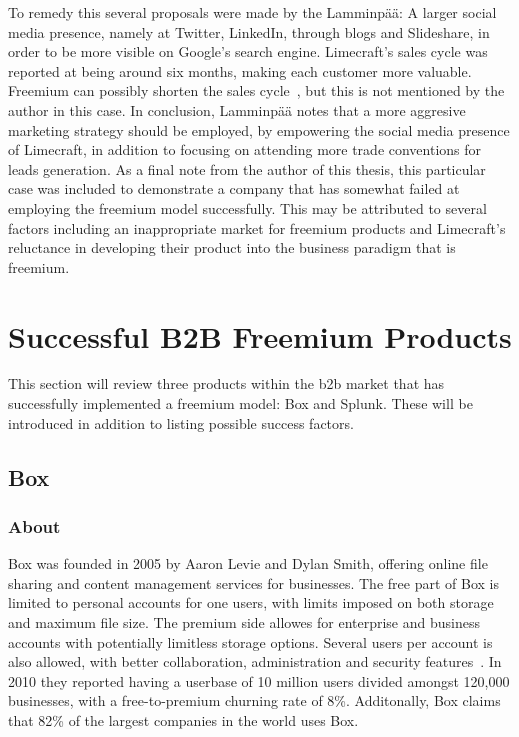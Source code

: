 {To remedy this several proposals were made by the Lamminpää: A larger social media presence, namely at Twitter, LinkedIn, through blogs and Slideshare, in order to be more visible on Google's search engine. Limecraft's sales cycle was reported at being around six months, making each customer more valuable. Freemium can possibly shorten the sales cycle~\cite{davidskokN/A}, but this is not mentioned by the author in this case. In conclusion, Lamminpää notes that a more aggresive marketing strategy should be employed, by empowering the social media presence of Limecraft, in addition to focusing on attending more trade conventions for leads generation. As a final note from the author of this thesis, this particular case was included to demonstrate a company that has somewhat failed at employing the freemium model successfully. This may be attributed to several factors including an inappropriate market for freemium products and Limecraft's reluctance in developing their product into the business paradigm that is freemium.  

\section{Successful B2B Freemium Products}
This section will review three products within the \gls{b2b} market that has successfully implemented a freemium model: Box and Splunk. These will be introduced in addition to listing possible success factors.
\subsection{Box}
\subsubsection{About}
Box was founded in 2005 by Aaron Levie and Dylan Smith, offering online file sharing and content management services for businesses. The free part of Box is limited to personal accounts for one users, with limits imposed on both storage and maximum file size. The premium side allowes for enterprise and business accounts with potentially limitless storage options. Several users per account is also allowed, with better collaboration, administration and security features~\cite{freemium.orgN/A}. In 2010 they reported having a userbase of 10 million users divided amongst 120,000 businesses, with a free-to-premium churning rate of 8\%. Additonally, Box claims that 82\% of the largest companies in the world uses Box.
}
